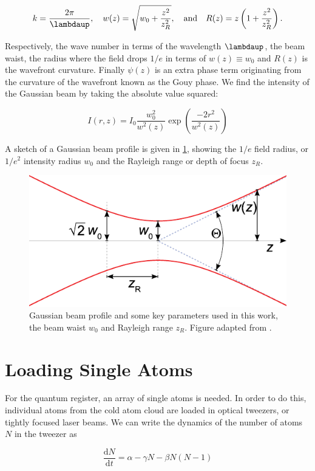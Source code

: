 \begin{equation}
	k = \frac{2\pi}{\lambdaup}, \quad 
	w(z) = \sqrt{w_0 + \frac{z^2}{z_R^2}}, \quad \text{and} \quad
	R(z) = z \left(1 + \frac{z^2}{z_R^2}\right).
\end{equation}

Respectively, the wave number in terms of the wavelength $\lambdaup$, the beam waist, the radius where the field drops $1/e$ in terms of $w(z)\equiv w_0$ and $R(z)$ is the wavefront curvature. Finally $\psi(z)$ is an extra phase term originating from the curvature of the wavefront known as the Gouy phase. We find the intensity of the Gaussian beam by taking the absolute value squared:

\begin{equation}\label{GaussianBeamIntensity}
	I(r,z) = I_0 \frac{w_0^2}{w^2(z)} \exp{\left(\frac{-2r^2}{w^2(z)}\right)}
\end{equation}

A sketch of a Gaussian beam profile is given in \cref{fig:GaussianBeam}, showing the $1/e$ field radius, or $1/e^2$ intensity radius $w_0$ and the Rayleigh range or depth of focus $z_R$. 

\begin{figure}
	\centering
	\includegraphics[width=0.4\linewidth]{figures/GaussianBeam.pdf}
	\caption{Gaussian beam profile and some key parameters used in this work, the beam waist $w_0$ and Rayleigh range $z_R$. Figure adapted from \cite{Hermans2009}.}
	\label{fig:GaussianBeam}
\end{figure}


\section{Loading Single Atoms}\label{sec:LoadingAtoms}

For the quantum register, an array of single atoms is needed. In order to do this, individual atoms from the cold atom cloud are loaded in optical tweezers, or tightly focused laser beams. We can write the dynamics of the number of atoms $N$ in the tweezer as \cite{Schlosser2002}

\begin{equation}\label{LoadingTweezer}
	\frac{\text{d}N}{\text{d}t} = \alpha - \gamma N - \beta N(N-1)
\end{equation}

